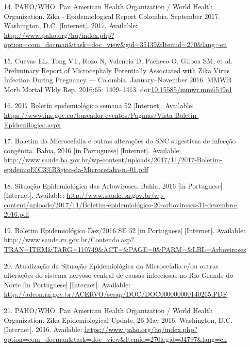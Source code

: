 \documentclass[10pt,letterpaper]{article}
\begin{document}
\hypertarget{ref-PahoColombia}{}
14. PAHO/WHO. Pan American Health Organization / World Health
Organization. Zika - Epidemiological Report Colombia. September 2017.
Washington, D.C. {[}Internet{]}. 2017. Available:
\url{http://www.paho.org/hq/index.php?option=com_docman\&task=doc_view\&gid=35139\&Itemid=270\&lang=en}

\hypertarget{ref-Cuevas2016b}{}
15. Cuevas EL, Tong VT, Rozo N, Valencia D, Pacheco O, Gilboa SM, et al.
Preliminary Report of Microcephaly Potentially Associated with Zika
Virus Infection During Pregnancy --- Colombia, January--November 2016.
MMWR Morb Mortal Wkly Rep. 2016;65: 1409--1413.
doi:\href{https://doi.org/10.15585/mmwr.mm6549e1}{10.15585/mmwr.mm6549e1}

\hypertarget{ref-ColombiaReport2017}{}
16. 2017 Boletín epidemiológico semana 52 {[}Internet{]}. Available:
\url{https://www.ins.gov.co/buscador-eventos/Paginas/Vista-Boletin-Epidemilogico.aspx}

\hypertarget{ref-BahiaReports}{}
17. Boletim da Microcefalia e outras alterações do SNC sugestivas de
infecção congênita. Bahia, 2016 {[}in Portuguese{]} {[}Internet{]}.
Available:
\url{http://www.saude.ba.gov.br/wp-content/uploads/2017/11/2017-Boletim-epidemiol\%C3\%B3gico-da-Microcefalia-n.-01.pdf}

\hypertarget{ref-BahiaReportsB}{}
18. Situação Epidemiológica das Arboviroses. Bahia, 2016 {[}in
Portuguese{]} {[}Internet{]}. Available:
\url{http://www.saude.ba.gov.br/wp-content/uploads/2017/11/Boletim-epidemiológico-20-arboviroses-31-dezembro-2016.pdf}

\hypertarget{ref-RioReports}{}
19. Boletim Epidemiológico Dez/2016 SE 52 {[}in Portuguese{]}
{[}Internet{]}. Available:
\url{http://www.saude.rn.gov.br/Conteudo.asp?TRAN=ITEM\&TARG=110749\&ACT=\&PAGE=0\&PARM=\&LBL=Arboviroses}

\hypertarget{ref-RioReportsB}{}
20. Atualização da Situação Epidemiológica da Microcefalia e/ou outras
alterações do sistema nervoso central de causas infecciosas no Rio
Grande do Norte {[}in Portuguese{]} {[}Internet{]}. Available:
\url{http://adcon.rn.gov.br/ACERVO/sesap/DOC/DOC000000000140265.PDF}

\hypertarget{ref-PernambucoReports}{}
21. PAHO/WHO. Pan American Health Organization / World Health
Organization. Zika Epidemiological Update, 26 May 2016. Washington, D.C.
{[}Internet{]}. 2016. Available:
\url{https://www.paho.org/hq/index.php?option=com_docman\&task=doc_view\&Itemid=270\&gid=34797\&lang=en}
\end{document}
